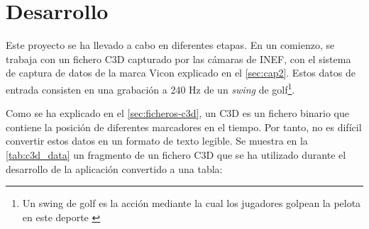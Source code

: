


\chapter{Desarrollo} \label{sec:cap3}

\noindent Este proyecto se ha llevado a cabo en diferentes etapas. En un comienzo, se trabaja con un fichero \ac{C3D} capturado por las cámaras de INEF, con el sistema de captura de datos de la marca Vicon explicado en el \autoref{sec:cap2}. Estos datos de entrada consisten en una grabación a 240 Hz de un \textit{swing} de golf\footnote{Un swing de golf es la acción mediante la cual los jugadores golpean la pelota en este deporte \autocite{GolfSwing2025}}. 

Como se ha explicado en el \autoref{sec:ficheros-c3d}, un \ac{C3D} es un fichero binario que contiene la posición de diferentes marcadores en el tiempo. Por tanto, no es difícil convertir estos datos en un formato de texto legible. Se muestra en la \autoref{tab:c3d_data} un fragmento de un fichero \ac{C3D} que se ha utilizado durante el desarrollo de la aplicación convertido a una tabla:

